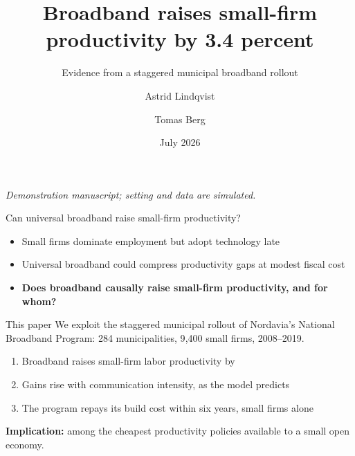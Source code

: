\documentclass[11pt, aspectratio=169]{beamer}
\title{Broadband raises small-firm productivity by 3.4 percent}
\subtitle{Evidence from a staggered municipal broadband rollout}
\author{Astrid Lindqvist \and Tomas Berg}
\date{July 2026}
\begin{document}
\begin{frame}[plain]
  \titlepage
  \vfill\centering\scriptsize\textit{Demonstration manuscript; setting and data are simulated.}
\end{frame}
\addtocounter{framenumber}{-1}

\begin{frame}[t]{Can universal broadband raise small-firm productivity?}
  \medskip
  \begin{itemize}\setlength{\itemsep}{0.7em}
    \item Small firms dominate employment but adopt technology late 
    \item Universal broadband could compress productivity gaps at modest fiscal cost
    \vspace*{-0.5em}
    \item[$\Rightarrow$] \textbf{Does broadband causally raise small-firm productivity, and for whom?}
  \end{itemize}
  \medskip
  {}
\end{frame}

\begin{frame}[t]{This paper}
  \medskip
  We exploit the staggered municipal rollout of Nordavia's National Broadband
  Program: 284 municipalities, 9{,}400 small firms, 2008--2019.
  \medskip
  \begin{enumerate}\setlength{\itemsep}{0.9em}
    \item Broadband raises small-firm labor productivity by    %
    \item Gains rise with communication intensity, as the model predicts   %
    \item The program repays its build cost within six years, small firms alone  %
  \end{enumerate}
  \medskip
  \textbf{Implication:} among the cheapest productivity policies available to a small open economy.
\end{frame}
\end{document}

